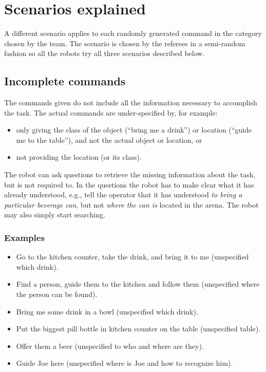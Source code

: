 %
%
\section{Scenarios explained}
\label{sec:eegpsr-categories-explained}
A different scenario applies to each randomly generated command in the category chosen by the team. The scenario is chosen by the referees in a semi-random fashion so all the robots try all three scenarios described below.


%
%
\subsection{Incomplete commands}
\label{sec:eegpsr-incomplete-command}
The commands given do not include all the information necessary to accomplish the task. The actual commands are under-specified by, for example:
\begin{itemize}
	\item only giving the class of the object (\enquote{bring me a drink}) or location (\enquote{guide me to the table}), and not the actual object or location, or
	\item not providing the location (or its class).
\end{itemize}

The robot can ask questions to retrieve the missing information about the task, but is not required to. In the questions the robot has to make clear what it has already understood, e.g., tell the operator that it has understood \textit{to bring a particular beverage can}, but not \textit{where the can is} located in the arena. The robot may also simply start searching.

\subsubsection{Examples}
\begin{itemize}
	\item Go to the kitchen counter, take the drink, and bring it to me (unspecified which drink).
	\item Find a person, guide them to the kitchen and follow them (unspecified where the person can be found).
	\item Bring me some drink in a bowl (unspecified which drink).
	\item Put the biggest pill bottle in kitchen counter on the table (unspecified table).
	\item Offer them a beer (unspecified to who and where are they).
	\item Guide Joe here (unspecified where is Joe and how to recognize him).
\end{itemize}



